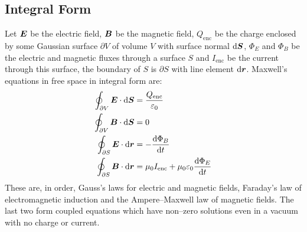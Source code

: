 \documentclass{article}
\begin{document}
    \subsection{Integral Form}
    Let \(\bm{E}\) be the electric field, \(\bm{B}\) be the magnetic field, \(Q_\text{enc}\) be the charge enclosed by some Gaussian surface \(\partial V\) of volume \(V\) with surface normal \(\dd\bm{S}\), \(\Phi_E\) and \(\Phi_B\) be the electric and magnetic fluxes through a surface \(S\) and \(I_\text{enc}\) be the current through this surface, the boundary of \(S\) is \(\partial S\) with line element \(\dd\bm{r}\).
    Maxwell's equations in free space in integral form are:
    \begin{align*}
        \oint_{\partial V}\bm{E}\cdot\dd\bm{S} &= \frac{Q_\text{enc}}{\varepsilon_0}\\
        \oint_{\partial V}\bm{B}\cdot\dd\bm{S} &= 0\\
        \oint_{\partial S}\bm{E}\cdot\dd\bm{r} &= -\dv{\Phi_B}{t}\\
        \oint_{\partial S}\bm{B}\cdot\dd\bm{r} &= \mu_0I_\text{enc} + \mu_0\varepsilon_0\dv{\Phi_E}{t}
    \end{align*}
    These are, in order, Gauss's laws for electric and magnetic fields, Faraday's law of electromagnetic induction and the Ampere--Maxwell law of magnetic fields.
    The last two form coupled equations which have non--zero solutions even in a vacuum with no charge or current.
    
\end{document}
